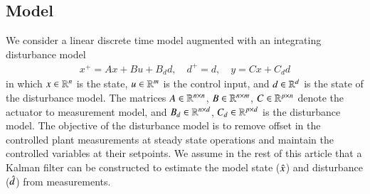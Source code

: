 \documentclass[preprint,5p, twocolumn, authoryear]{elsarticle}
\begin{document}
\subsection{Model}
We consider a linear discrete time model augmented with an integrating
disturbance model \citep{pannocchia:rawlings:2003}
\begin{align}\label{eq:ltimodel}
    x^+ = Ax + Bu + B_dd, \quad d^+ = d, \quad y = Cx + C_dd
\end{align}
in which $x \in \mathbb{R}^n$ is the state, $u \in \mathbb{R}^m$ is the control input, and
$d \in \mathbb{R}^d$ is the state of the disturbance model. The matrices $A \in
\mathbb{R}^{n \times n}$, $B \in \mathbb{R}^{n \times m}$,  
$C \in \mathbb{R}^{p \times n}$ denote the actuator to measurement model, and $B_d \in
\mathbb{R}^{n \times d}$, $C_d \in \mathbb{R}^{p \times d}$ is the disturbance model. The
objective of the disturbance model is to remove offset in the controlled plant
measurements at steady state operations and maintain the controlled variables at
their setpoints. We assume in the rest of this article that a Kalman filter can
be constructed to estimate the model state ($\hat{x}$) and disturbance ($\hat{d}$)
from measurements. 
\end{document}
